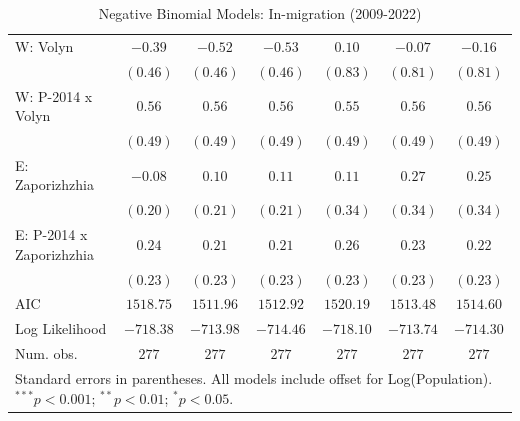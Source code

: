 \begin{table}
\begin{center}
\begin{small}
\begin{tabular}{l c c c c c c}
W: Volyn                    & $-0.39$       & $-0.52$       & $-0.53$       & $0.10$       & $-0.07$      & $-0.16$      \\
                            & $(0.46)$      & $(0.46)$      & $(0.46)$      & $(0.83)$     & $(0.81)$     & $(0.81)$     \\
W: P-2014 x Volyn           & $0.56$        & $0.56$        & $0.56$        & $0.55$       & $0.56$       & $0.56$       \\
                            & $(0.49)$      & $(0.49)$      & $(0.49)$      & $(0.49)$     & $(0.49)$     & $(0.49)$     \\
E: Zaporizhzhia             & $-0.08$       & $0.10$        & $0.11$        & $0.11$       & $0.27$       & $0.25$       \\
                            & $(0.20)$      & $(0.21)$      & $(0.21)$      & $(0.34)$     & $(0.34)$     & $(0.34)$     \\
E: P-2014 x Zaporizhzhia    & $0.24$        & $0.21$        & $0.21$        & $0.26$       & $0.23$       & $0.22$       \\
                            & $(0.23)$      & $(0.23)$      & $(0.23)$      & $(0.23)$     & $(0.23)$     & $(0.23)$     \\
\hline
AIC                         & $1518.75$     & $1511.96$     & $1512.92$     & $1520.19$    & $1513.48$    & $1514.60$    \\
Log Likelihood              & $-718.38$     & $-713.98$     & $-714.46$     & $-718.10$    & $-713.74$    & $-714.30$    \\
Num. obs.                   & $277$         & $277$         & $277$         & $277$        & $277$        & $277$        \\
\hline
\multicolumn{7}{l}{\tiny{Standard errors in parentheses. All models include offset for Log(Population). $^{***}p<0.001$; $^{**}p<0.01$; $^{*}p<0.05$.}}
\end{tabular}
\end{small}
\caption{Negative Binomial Models: In-migration (2009-2022)}
\label{tab:in_migration}
\end{center}
\end{table}
